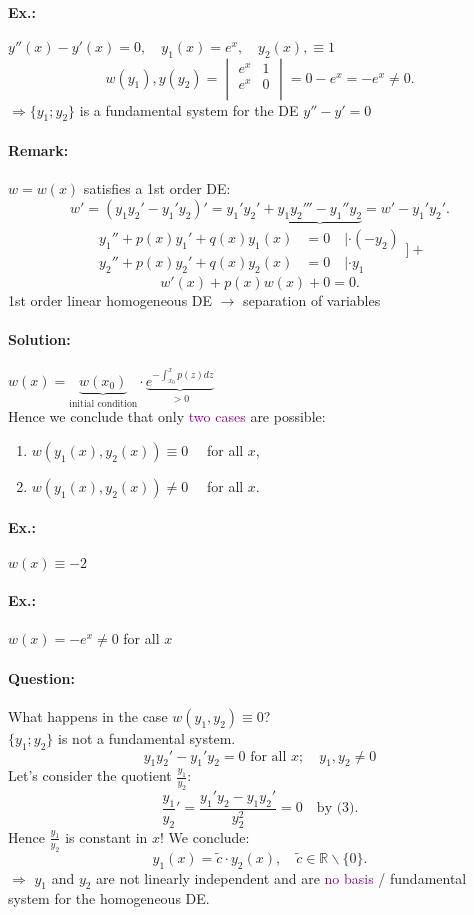 \documentclass[]{article}
\begin{document}
\paragraph{Ex.:} $y''(x)-y'(x)=0,\quad y_1(x)=e ^{x},\quad y_2(x),\equiv 1$
\[
w(y_1),y(y_2) = \begin{vmatrix}
	e ^{x} & 1 \\ e ^{x} & 0\\
\end{vmatrix} = 0- e ^{x}= -e ^{x}\not=0
.\]
$\Rightarrow \{y_1;y_2\}$ is a fundamental system for the DE $y''-y'=0$
 \paragraph{Remark:} $w=w(x)$ satisfies a 1st order DE:
 \[
	 w'= (y_1y_2'-y_1'y_2) ' = y_1'y_2'+\underbrace{y_1y_2'''-y_1''y_2}{=w'}-y_1'y_2'
 .\]
 \[\begin{split}
 	y_1''+p(x)y_1'+q(x)y_1(x) & =0\quad| \cdot (-y_2) \\
 	y_2''+p(x)y_2'+q(x)y_2(x) & =0\quad| \cdot y_1
\end{split}\Big]+\]
\[
w'(x)+p(x)w(x)+0=0
.\]
1st order linear homogeneous DE $\to$ separation of variables
\paragraph{Solution:} $w(x)= \underbrace{w(x_0)}_{ \text{initial condition}} \cdot  \underbrace{e ^{- \int_{x_0}^{x} p(z)dz}}_{ >0} $\\
Hence we conclude that only \textcolor{purple}{two cases} are possible:
\begin{enumerate}
	\item $w(y_1(x),y_2(x)) \equiv 0\quad$ for all  $x$,
	\item $w(y_1(x),y_2(x)) \not=0\quad$ for all $x$.
\end{enumerate}
\paragraph{Ex.:} $w(x)\equiv -2$ 
\paragraph{Ex.:} $w(x)=-e ^{x}\not=0$ for all $x$ 
\paragraph{Question:} What happens in the case $w(y_1,y_2)\equiv 0$?\\
$ \{y_1;y_2\}$ is not a fundamental system.
\begin{equation}
y_1y_2'-y_1'y_2=0 \text{ for all } x;\quad y_1,y_2 \not=0
\end{equation}
Let's consider the quotient $ \frac{y_1}{y_2}$:
\[
\frac{y_1}{y_2}'= \frac{y_1'y_2-y_1y_2'}{y_2 ^{2}}=0\quad \text{by (3)}
.\]
Hence $ \frac{y_1}{y_2}$ is constant in $x$! We conclude:
\[
y_1(x)=\tilde c \cdot y_2(x),\quad \tilde c\in \mathbb R \backslash \{0\}
.\]
$\Rightarrow$  $y_1$ and $y_2$ are not linearly independent and are \textcolor{purple}{no basis} / fundamental system for the homogeneous DE.
\end{document}
